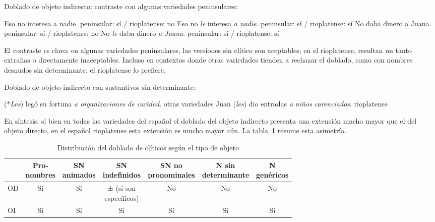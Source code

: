 \begin{exe}
  \ex\label{ex:15-oi} Doblado de objeto indirecto: contraste con algunas
      variedades peninsulares:
    \begin{xlist}
      \ex Eso no interesa a nadie. \hfill peninsular: sí / rioplatense: no
      \ex Eso no \textit{le} interesa \textit{a nadie}. \hfill peninsular: sí /
          rioplatense: sí
      \ex No daba dinero a Juana. \hfill peninsular: sí / rioplatense: no
      \ex No \textit{le} daba dinero \textit{a Juana}. \hfill peninsular: sí /
          rioplatense: sí
    \end{xlist}
\end{exe}

El contraste es claro: en algunas variedades peninsulares, las versiones sin
clítico son aceptables; en el rioplatense, resultan un tanto extrañas o
directamente inaceptables. Incluso en contextos donde otras variedades tienden a
rechazar el doblado, como con nombres desnudos sin determinante, el rioplatense
lo prefiere.

\begin{exe}
  \ex\label{ex:15-desnudos} Doblado de objeto indirecto con sustantivos sin
      determinante:
    \begin{xlist}
      \ex (*\textit{Les}) legó su fortuna \textit{a organizaciones de caridad}.
          \hfill otras variedades
      \ex Juan (\textit{les}) dio entradas \textit{a niños carenciados}. \hfill
          rioplatense
    \end{xlist}
\end{exe}

En síntesis, si bien en todas las variedades del español el doblado del objeto
indirecto presenta una extensión mucho mayor que el del objeto directo, en el
español rioplatense esta extensión es mucho mayor aún. La
tabla~\ref{tab:15-doblado} resume esta asimetría.

\begin{table}[htbp]
  \centering\small\setlength{\tabcolsep}{3pt}
  \caption{Distribución del doblado de clíticos según el tipo de
    objeto}\label{tab:15-doblado}
  \begin{tabular}{@{}lcccccc@{}}
    \toprule
    & \makecell{Pro-\\nombres} & \makecell{SN\\animados} &
      \makecell{SN\\indefinidos} & \makecell{SN no\\pronominales} &
      \makecell{N sin\\determinante} & \makecell{N\\genéricos} \\
    \midrule
    OD & Sí & Sí & \makecell{± (si son\\específicos)} & No & No & No \\
    OI & Sí & Sí & Sí & Sí & Sí & Sí \\
    \bottomrule
  \end{tabular}
\end{table}

